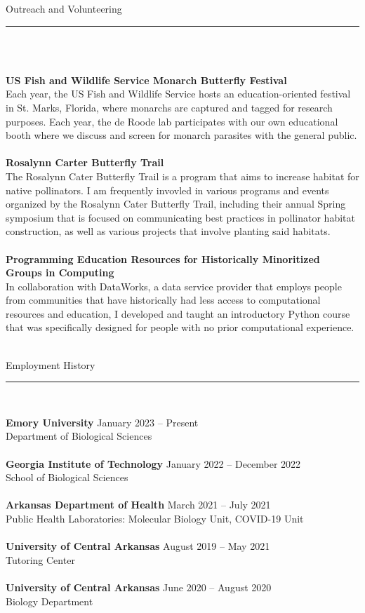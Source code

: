 \documentclass{article}
\begin{document}
\begin{flushleft}
{\Large Outreach and Volunteering} \rule{16.51cm}{0.4pt}\\
\end{flushleft}
\\
\textbf{US Fish and Wildlife Service Monarch Butterfly Festival}\\
Each year, the US Fish and Wildlife Service hosts an education-oriented festival in St. Marks, Florida, where
monarchs are captured and tagged for research purposes. Each year, the de Roode lab participates with our own 
educational booth where we discuss and screen for monarch parasites with the general public. \\
\\
\textbf{Rosalynn Carter Butterfly Trail}\\
The Rosalynn Cater Butterfly Trail is a program that aims to increase habitat for native pollinators. I am frequently
invovled in various programs and events organized by the Rosalynn Cater Butterfly Trail, including their annual Spring
symposium that is focused on communicating best practices in pollinator habitat construction, as well as various projects
that involve planting said habitats. \\
\\
\textbf{Programming Education Resources for Historically Minoritized Groups in Computing}\\
In collaboration with DataWorks, a data service provider that employs people from communities that have historically 
had less access to computational resources and education, I developed and taught an introductory Python course that was specifically
designed for people with no prior computational experience.
\\
\\
\begin{flushleft}
{\Large Employment History} \rule{16.51cm}{0.4pt}\\
\end{flushleft}
\textbf{Emory University} \hfill January 2023 – Present\\
Department of Biological Sciences \\
\\
\textbf{Georgia Institute of Technology} \hfill January 2022 – December 2022\\
School of Biological Sciences \\
\\
\textbf{Arkansas Department of Health} \hfill March 2021 – July 2021\\
Public Health Laboratories: Molecular Biology Unit, COVID-19 Unit\\
\\
\textbf{University of Central Arkansas} \hfill August 2019 – May 2021\\
Tutoring Center\\
\\
\textbf{University of Central Arkansas} \hfill June 2020 – August 2020\\
Biology Department\\
\end{document}
